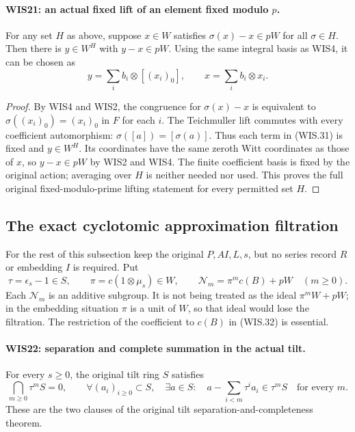 \documentclass[11pt,a4paper]{article}
\numberwithin{equation}{section}
\theoremstyle{remark}\newtheorem{remark}[theorem]{Remark}
\begin{document}
\paragraph{WIS21: an actual fixed lift of an element fixed modulo $p$.}
\label{claim:WIS21}
For any set $H$ as above, suppose $x\in W$ satisfies
$\sigma(x)-x\in pW$ for all $\sigma\in H$.
Then there is $y\in W^H$ with $y-x\in pW$.
Using the same integral basis as WIS4, it can be chosen as
\[
            y=\sum_i b_i\otimes[(x_i)_0],
            \qquad x=\sum_i b_i\otimes x_i.                \tag{WIS.31}
\]

\begin{proof}
By WIS4 and WIS2, the congruence for $\sigma(x)-x$
is equivalent to
$\sigma((x_i)_0)=(x_i)_0$ in $F$ for each $i$.
The Teichmuller lift commutes with every coefficient
automorphism: $\sigma([a])=[\sigma(a)]$.
Thus each term in (WIS.31) is fixed and $y\in W^H$.
Its coordinates have the same zeroth Witt coordinates
as those of $x$, so $y-x\in pW$ by WIS2 and WIS4.
The finite coefficient basis is fixed by the original
action; averaging over $H$ is neither needed nor used.
This proves the full original fixed-modulo-prime
lifting statement for every permitted set $H$.
\end{proof}

\subsection{The exact cyclotomic approximation filtration}

For the rest of this subsection keep the original $P,AI,L,s$,
but no series record $R$ or embedding $I$ is required.
Put
\[
 \tau=\epsilon_s-1\in S,\qquad
 \pi=c(1\otimes\mu_s)\in W,\qquad
 \mathcal N_m=\pi^mc(B)+pW\quad(m\geq0).                    \tag{WIS.32}
\]
Each $\mathcal N_m$ is an additive subgroup. It is not being
treated as the ideal $\pi^mW+pW$; in the embedding situation
$\pi$ is a unit of $W$, so that ideal would lose the
filtration. The restriction of the coefficient to $c(B)$
in (WIS.32) is essential.

\paragraph{WIS22: separation and complete summation in the actual tilt.}
\label{claim:WIS22}
For every $s\geq0$, the original tilt ring $S$ satisfies
\[
 \bigcap_{m\geq0}\tau^mS=0,\qquad
 \forall(a_i)_{i\geq0}\subset S,\quad
 \exists a\in S:\quad
 a-\sum_{i<m}\tau^ia_i\in\tau^mS\quad\text{for every }m.
                                                               \tag{WIS.33}
\]
These are the two clauses of the original
tilt separation-and-completeness theorem.
\end{document}
